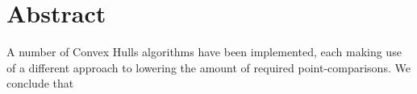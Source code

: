 \section{Abstract}
A number of Convex Hulls algorithms have been implemented, each making use of a different approach to lowering the amount of required point-comparisons.
We conclude that
